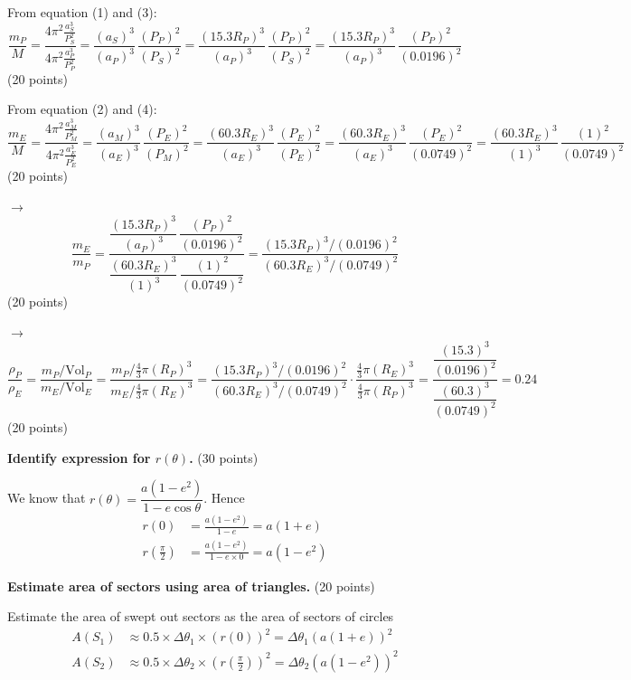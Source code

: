 From equation (1) and (3):
\[ \frac{m_P}{M}
   = \frac{4\pi^2 \frac{a_S^3}{P_S^2}}{4\pi^2 \frac{a_P^3}{P_P^2}}
   = \frac{(a_S)^3}{(a_P)^3}\,\frac{(P_P)^2}{(P_S)^2}
   = \frac{(15.3R_P)^3}{(a_P)^3}\,\frac{(P_P)^2}{(P_S)^2}
   = \frac{(15.3R_P)^3}{(a_P)^3}\,\frac{(P_P)^2}{(0.0196)^2} \]
\hfill(20 points)

From equation (2) and (4):
\[ \frac{m_E}{M}
   = \frac{4\pi^2 \frac{a_M^3}{P_M^2}}{4\pi^2 \frac{a_E^3}{P_E^2}}
   = \frac{(a_M)^3}{(a_E)^3}\,\frac{(P_E)^2}{(P_M)^2}
   = \frac{(60.3R_E)^3}{(a_E)^3}\,\frac{(P_E)^2}{(P_E)^2} %
   = \frac{(60.3R_E)^3}{(a_E)^3}\,\frac{(P_E)^2}{(0.0749)^2}
   = \frac{(60.3R_E)^3}{(1)^3}\,\frac{(1)^2}{(0.0749)^2} \]
\hfill(20 points)

$\rightarrow$
\[ \frac{m_E}{m_P}
   = \frac{\dfrac{(15.3R_P)^3}{(a_P)^3}\,\dfrac{(P_P)^2}{(0.0196)^2}}
          {\dfrac{(60.3R_E)^3}{(1)^3}\,\dfrac{(1)^2}{(0.0749)^2}}
   = \frac{(15.3R_P)^3/(0.0196)^2}{(60.3R_E)^3/(0.0749)^2} \]
\hfill(20 points)

$\rightarrow$
\[ \frac{\rho_P}{\rho_E}
   = \frac{m_P/\mathrm{Vol}_P}{m_E/\mathrm{Vol}_E}
   = \frac{m_P/\frac{4}{3}\pi(R_P)^3}{m_E/\frac{4}{3}\pi(R_E)^3}
   = \frac{(15.3R_P)^3/(0.0196)^2}{(60.3R_E)^3/(0.0749)^2}
     \cdot \frac{\frac{4}{3}\pi(R_E)^3}{\frac{4}{3}\pi(R_P)^3}
   = \frac{\dfrac{(15.3)^3}{(0.0196)^2}}{\dfrac{(60.3)^3}{(0.0749)^2}}
   = 0.24 \]
\hfill(20 points)

\textbf{Identify expression for $r(\theta)$.} \hfill(30 points)

We know that
$r(\theta) = \dfrac{a\left(1 - e^2\right)}{1 - e\cos\theta}$. Hence %
\begin{align*}
  r(0) &= \frac{a\left(1 - e^2\right)}{1 - e} = a(1 + e) \\
  r\left(\frac{\pi}{2}\right)
    &= \frac{a\left(1 - e^2\right)}{1 - e\times0} = a\left(1 - e^2\right)
\end{align*}


\medskip
\textbf{Estimate area of sectors using area of triangles.} \hfill(20 points)

Estimate the area of swept out sectors as the area of sectors of circles
\begin{align*}
  A(S_1) &\approx 0.5\times\Delta\theta_1\times\left(r(0)\right)^2
    = \Delta\theta_1\left(a(1 + e)\right)^2 \\ %
  A(S_2) &\approx 0.5\times\Delta\theta_2
    \times\left(r\left(\tfrac{\pi}{2}\right)\right)^2
    = \Delta\theta_2\left(a(1 - e^2)\right)^2
\end{align*}

